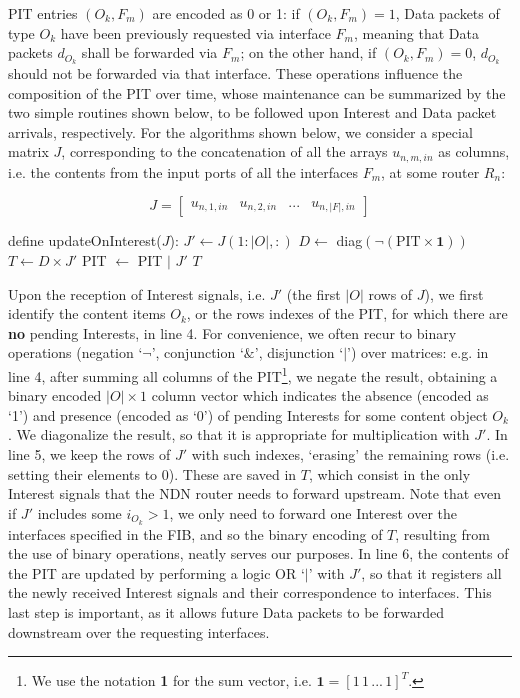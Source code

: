 PIT entries 
$(O_k,F_m)$ are encoded as 0 or 1: if $(O_k,F_m) = 1$, Data packets of 
type $O_k$ have been previously requested via interface $F_m$, meaning that Data 
packets $d_{O_k}$ shall be forwarded via $F_m$; on the other hand, 
if $(O_k,F_m) = 0$, $d_{O_k}$ should not be forwarded via that 
interface. These operations influence the composition of the PIT over time, whose 
maintenance can be summarized by the two simple routines shown below, to be 
followed upon Interest and Data packet arrivals, respectively. For the algorithms shown 
below, we consider a special matrix $J$, corresponding to the concatenation of 
all the arrays $u_{n,m,in}$ as columns, i.e. the contents from the input ports 
of all the interfaces $F_m$, at some router $R_n$:

\begin{equation}
J = \begin{bmatrix} u_{n,1,in} & u_{n,2,in} & ... & u_{n,|F|,in} \end{bmatrix}
    \label{eq:j}
\end{equation}\shortvertbreak

\begin{algorithmic}[1]

\State define updateOnInterest($J$):
\State
    \State $J' \leftarrow J(1:|O|,:)$
    \State $D \leftarrow$ diag$(\neg(\text{PIT} \times \textbf{1}))$
    \State $T \leftarrow D \times J'$ 
    \State PIT $\leftarrow$ PIT $|$ $J'$ 
    \State \Return $T$

\end{algorithmic}\shortvertbreak

Upon the reception of Interest signals, i.e. $J'$ (the first $|O|$ rows 
of $J$), we first identify the content items $O_k$, or the rows indexes of the 
PIT, for which there are \textbf{no} pending Interests, in line 4. For 
convenience, we often recur to binary operations (negation `$\neg$', 
conjunction `$\&$', disjunction `$|$') over matrices: e.g. in line 4, after 
summing all columns of the PIT\footnote{We use the notation \textbf{1} for the 
sum vector, i.e. $\textbf{1} = [1\,1\,...\,1]^{T}$.}, we negate the 
result, obtaining a binary encoded $|O| \times 1$ 
column vector which indicates the absence (encoded as  `1') and presence 
(encoded as `0') of pending Interests for some content object $O_k$. We diagonalize 
the result, so that it is appropriate for multiplication with $J'$. In line 5, 
we 
keep the rows of $J'$ with such indexes, `erasing' the remaining rows (i.e. 
setting their elements to 0). These are saved in $T$, which consist in the only 
Interest signals that the NDN router needs to forward upstream. Note that even 
if $J'$ includes some $i_{O_k} > 1$, we only need to forward one Interest 
over the interfaces specified in the FIB, and so the binary encoding of $T$, 
resulting from the use of binary operations, neatly serves our purposes. 
In line 6, the 
contents of the PIT are updated by performing a logic OR `$|$' with $J'$, so 
that it registers all the newly received 
Interest signals and their correspondence to interfaces. This last step is important, 
as it allows future Data packets to be forwarded downstream over the requesting 
interfaces.\shortvertbreak

